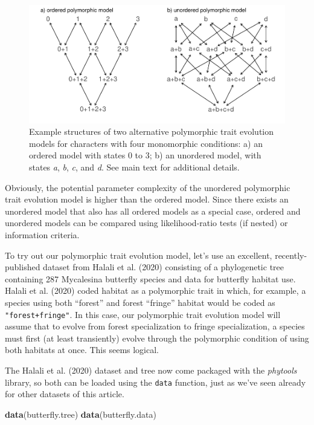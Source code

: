 \documentclass[fleqn,10pt,lineno]{wlpeerj} %
\newenvironment{Shaded}{\begin{snugshade}}{\end{snugshade}}
\newcommand{\FunctionTok}[1]{\textcolor[rgb]{0.13,0.29,0.53}{\textbf{#1}}}
\newcommand{\NormalTok}[1]{#1}
\begin{document}
\begin{figure}
\includegraphics[width=1\linewidth]{Revell.phytools-v2_peerj_files/figure-latex/structure-polyMk-1} \caption{Example structures of two alternative polymorphic trait evolution models for characters with four monomorphic conditions: a) an ordered model with states 0 to 3; b) an unordered model, with states \textit{a}, \textit{b}, \textit{c}, and \textit{d}. See main text for additional details.}\label{fig:structure-polyMk}
\end{figure}

Obviously, the potential parameter complexity of the unordered polymorphic trait evolution model is higher than the ordered model. Since there exists an unordered model that also has all ordered models as a special case, ordered and unordered models can be compared using likelihood-ratio tests (if nested) or information criteria.

To try out our polymorphic trait evolution model, let's use an excellent, recently-published dataset from Halali et al. (2020) consisting of a phylogenetic tree containing 287 Mycalesina butterfly species and data for butterfly habitat use. Halali et al. (2020) coded habitat as a polymorphic trait in which, for example, a species using both ``forest'' and forest ``fringe'' habitat would be coded as \texttt{"forest+fringe"}. In this case, our polymorphic trait evolution model will assume that to evolve from forest specialization to fringe specialization, a species must first (at least transiently) evolve through the polymorphic condition of using both habitats at once. This seems logical.

The Halali et al. (2020) dataset and tree now come packaged with the \emph{phytools} library, so both can be loaded using the \texttt{data} function, just as we've seen already for other datasets of this article.

\begin{Shaded}
\begin{Highlighting}[]
\FunctionTok{data}\NormalTok{(butterfly.tree)}
\FunctionTok{data}\NormalTok{(butterfly.data)}
\end{Highlighting}
\end{Shaded}
\end{document}
